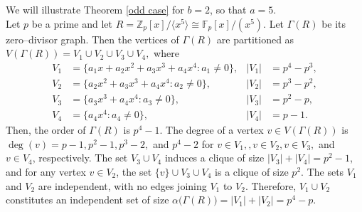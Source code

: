 \documentclass[12pt,twoside]{article}
\begin{document}
We will illustrate Theorem \ref{odd case} for $b=2$, so that $a=5.$\\
	Let $p$ be a prime and let $R= \mathbb{Z}_p[x]/\langle x^5\rangle \cong \mathbb{F}_p[x]/(x^5).$	Let $ \varGamma(R)$ be its zero--divisor graph. Then  the vertices of $ \varGamma(R)$ are partitioned as $V( \varGamma(R)) = V_1 \cup V_2 \cup V_3 \cup V_4,$
	where
	\[
	\begin{aligned}
		V_1 &= \{a_1x + a_2x^2 + a_3x^3 + a_4x^4 : a_1 \neq 0\},
		& |V_1| &= p^4 - p^3,\\[2pt]
		V_2 &= \{a_2x^2 + a_3x^3 + a_4x^4 : a_2 \neq 0\},
		& |V_2| &= p^3 - p^2,\\[2pt]
		V_3 &= \{a_3x^3 + a_4x^4 : a_3 \neq 0\},
		& |V_3| &= p^2 - p,\\[2pt]
		V_4 &= \{a_4x^4 : a_4 \neq 0\},
		& |V_4| &= p-1.
	\end{aligned}
	\]
	Then, the order of $ \varGamma(R)$  is $p^4 - 1.$ The degree of a vertex $v\in V( \varGamma(R))$ is $
			\deg(v) = p-1, p^{2}-1, p^{3}-2, $ and $p^{4}-2 $ for $ v\in V_1,, v\in V_2, v\in V_3, $ and $ v\in V_4$, respectively. The set $V_3 \cup V_4$ induces a clique of size $|V_3|+|V_4| = p^2 - 1$, and for any
			vertex $v\in V_2$, the set $\{v\} \cup V_3 \cup V_4 $ is a clique of size $p^2$.  The sets $V_1$ and $V_2$ are independent, with no edges joining $V_1$ to $V_2$. Therefore, $V_1\cup V_2$ constitutes an independent set of size $\alpha\bigl( \varGamma(R)\bigr) = |V_1| + |V_2| = p^4 - p$.
	
\end{document}
